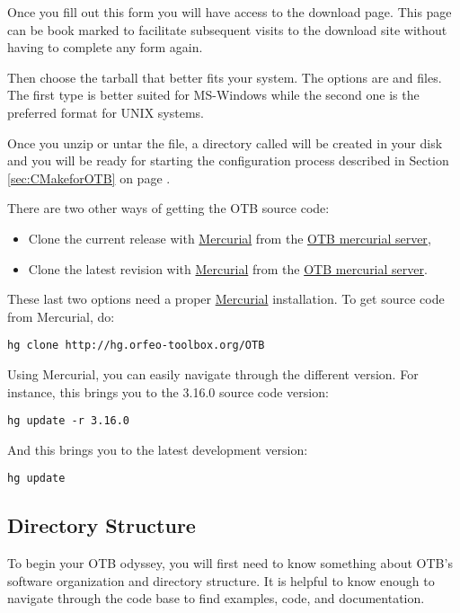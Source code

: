 Once you fill out this form you will have access to the download
page. This page can be book marked to facilitate subsequent visits to
the download site without having to complete any form again.

 Then choose the tarball that better fits your system. The options
are  and  files.  The first type is better suited for
MS-Windows while the second one is the preferred format for UNIX systems.

Once you unzip or untar the file, a directory called  will be
created in your disk and you will be ready for starting the configuration
process described in Section \ref{sec:CMakeforOTB} on page
\pageref{sec:CMakeforOTB}.


There are two other ways of getting the OTB source code:
\begin{itemize}
\item Clone the current release with \href{http://mercurial.selenic.com}{Mercurial} from the \href{http://hg.orfeo-toolbox.org/OTB}{OTB mercurial server},
\item Clone the latest revision with \href{http://mercurial.selenic.com}{Mercurial} from the \href{http://hg.orfeo-toolbox.org/OTB}{OTB mercurial server}.
\end{itemize}

These last two options need a proper \href{http://mercurial.selenic.com}{Mercurial} installation. To get source code from Mercurial, do:
\begin{verbatim}
hg clone http://hg.orfeo-toolbox.org/OTB
\end{verbatim}

Using Mercurial, you can easily navigate through the different version. For instance, this brings you to the 3.16.0 source code version:
\begin{verbatim}
hg update -r 3.16.0
\end{verbatim}

And this brings you to the latest development version:
\begin{verbatim}
hg update
\end{verbatim}


\subsection{Directory Structure}
\label{sec:DirectoryStructure}

To begin your OTB odyssey, you will first need to know something about OTB's
software organization and directory structure. It is helpful to know enough to
navigate through the code base to find examples, code, and documentation.



